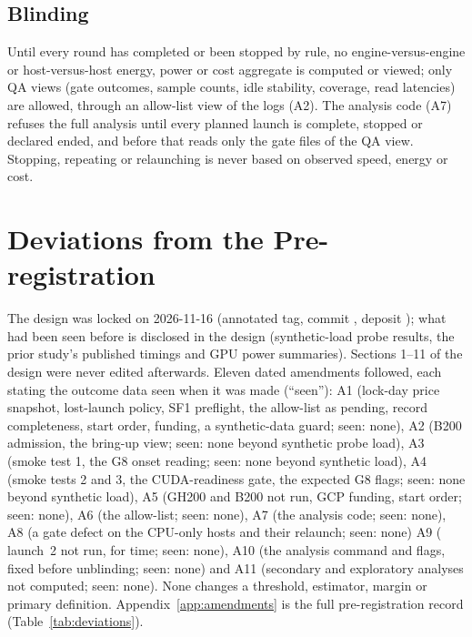 \documentclass[sigconf]{acmart}
\begin{document}
\subsection{Blinding}
\label{sec:blinding}
Until every round has completed or been stopped by rule, no engine-versus-engine or
host-versus-host energy, power or cost aggregate is computed or viewed; only QA views (gate
outcomes, sample counts, idle stability, coverage, read latencies) are allowed, through an
allow-list view of the logs (A2). The analysis code (A7) refuses the full analysis until
every planned launch is complete, stopped or declared ended, and before that reads only the gate
files of the QA view. Stopping, repeating or relaunching is never based on observed
speed, energy or cost.

\section{Deviations from the Pre-registration}
\label{sec:deviations}

The design was locked on 2026-11-16 (annotated tag, commit \lockcommit{}, deposit \lockdoi{});
what had been seen before is disclosed in the design (synthetic-load probe results, the prior
study's published timings and GPU power summaries). Sections 1--11 of the design were never
edited afterwards. Eleven dated amendments followed, each stating the outcome data seen when it was
made (``seen''): A1 (lock-day price snapshot, lost-launch policy, SF1 preflight, the \CG{}
allow-list as pending, record completeness, start order, funding, a synthetic-data guard; seen:
none), A2 (B200 admission, the bring-up view; seen: none beyond synthetic probe load), A3 (smoke
test 1, the G8 onset reading; seen: none beyond synthetic load), A4 (smoke tests 2 and 3, the
CUDA-readiness gate, the expected G8 flags; seen: none beyond synthetic load), A5 (GH200 and B200
not run, GCP funding, start order; seen: none), A6 (the \CG{} allow-list; seen: none), A7 (the
analysis code; seen: none), A8 (a gate defect on the CPU-only hosts and their relaunch; seen: none)
A9 (\CG{} launch~2 not run, for time; seen: none), A10 (the analysis command and flags, fixed before
unblinding; seen: none) and A11 (secondary and exploratory analyses not computed; seen: none). None changes a threshold, estimator, margin or primary definition.
Appendix~\ref{app:amendments} is the full pre-registration record (Table~\ref{tab:deviations}).
\end{document}
